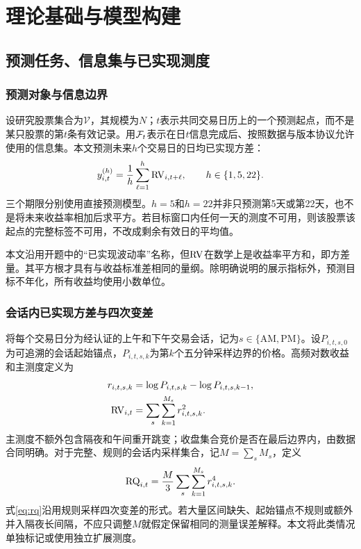 \chapter{理论基础与模型构建}
\section{预测任务、信息集与已实现测度}
\subsection{预测对象与信息边界}
设研究股票集合为$\mathcal V$，其规模为$N$；$t$表示共同交易日历上的一个预测起点，而不是某只股票的第$t$条有效记录。用$\mathcal F_t$表示在日$t$信息完成后、按照数据与版本协议允许使用的信息集。本文预测未来$h$个交易日的日均已实现方差：
\begin{equation}\label{eq:target}
y_{i,t}^{(h)}=\frac1h\sum_{\ell=1}^{h}\operatorname{RV}_{i,t+\ell},\qquad h\in\{1,5,22\}.
\end{equation}
三个期限分别使用直接预测模型。$h=5$和$h=22$并非只预测第5天或第22天，也不是将未来收益率相加后求平方。若目标窗口内任何一天的测度不可用，则该股票该起点的完整标签不可用，不改成剩余有效日的平均值。

本文沿用开题中的“已实现波动率”名称，但$\operatorname{RV}$在数学上是收益率平方和，即方差量。其平方根才具有与收益标准差相同的量纲。除明确说明的展示指标外，预测目标不年化，所有收益均使用小数单位。

\subsection{会话内已实现方差与四次变差}
将每个交易日分为经认证的上午和下午交易会话，记为$s\in\{\mathrm{AM},\mathrm{PM}\}$。设$P_{i,t,s,0}$为可追溯的会话起始锚点，$P_{i,t,s,k}$为第$k$个五分钟采样边界的价格。高频对数收益和主测度定义为
\begin{align}
 r_{i,t,s,k}&=\log P_{i,t,s,k}-\log P_{i,t,s,k-1},\label{eq:intradayreturn}\\
 \operatorname{RV}_{i,t}&=\sum_s\sum_{k=1}^{M_s}r_{i,t,s,k}^{2}.\label{eq:rv}
\end{align}
主测度不额外包含隔夜和午间重开跳变；收盘集合竞价是否在最后边界内，由数据合同明确。对于完整、规则的会话内采样集合，记$M=\sum_s M_s$，定义
\begin{equation}\label{eq:rq}
\operatorname{RQ}_{i,t}=\frac M3\sum_s\sum_{k=1}^{M_s}r_{i,t,s,k}^{4}.
\end{equation}
式\eqref{eq:rq}沿用规则采样四次变差的形式\cite{bpq2016}。若大量区间缺失、起始锚点不规则或额外并入隔夜长间隔，不应只调整$M$就假定保留相同的测量误差解释。本文将此类情况单独标记或使用独立扩展测度。

